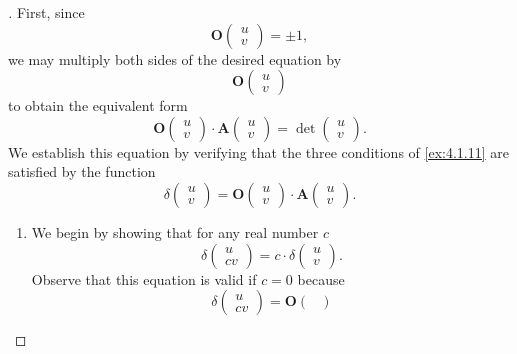 \begin{proof}[]
	First, since
	\[
		\mathbf{O}\begin{pmatrix}
			u \\
			v
		\end{pmatrix} = \pm 1,
	\]
	we may multiply both sides of the desired equation by
	\[
		\mathbf{O}\begin{pmatrix}
			u \\
			v
		\end{pmatrix}
	\]
	to obtain the equivalent form
	\[
		\mathbf{O}\begin{pmatrix}
			u \\
			v
		\end{pmatrix} \cdot \mathbf{A}\begin{pmatrix}
			u \\
			v
		\end{pmatrix} = \det\begin{pmatrix}
			u \\
			v
		\end{pmatrix}.
	\]
	We establish this equation by verifying that the three conditions of \cref{ex:4.1.11} are satisfied by the function
	\[
		\delta\begin{pmatrix}
			u \\
			v
		\end{pmatrix} = \mathbf{O}\begin{pmatrix}
			u \\
			v
		\end{pmatrix} \cdot \mathbf{A}\begin{pmatrix}
			u \\
			v
		\end{pmatrix}.
	\]
	\begin{enumerate}
		\item We begin by showing that for any real number \(c\)
		      \[
			      \delta\begin{pmatrix}
				      u \\
				      cv
			      \end{pmatrix} = c \cdot \delta\begin{pmatrix}
				      u \\
				      v
			      \end{pmatrix}.
		      \]
		      Observe that this equation is valid if \(c = 0\) because
		      \[
			      \delta\begin{pmatrix}
				      u \\
				      cv
			      \end{pmatrix} = \mathbf{O}\begin{pmatrix}

\end{pmatrix}\]
\end{enumerate}
\end{proof}
